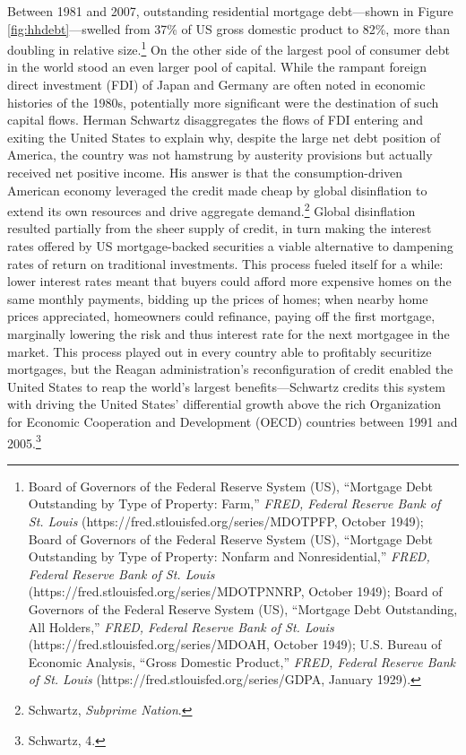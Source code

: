 \documentclass[12pt,oneside]{psthesis}
\begin{document}
Between 1981 and 2007, outstanding residential mortgage debt---shown in Figure \ref{fig:hhdebt}---swelled from 37\% of US gross domestic product to 82\%, more than doubling in relative size.\footnote{Board of Governors of the Federal Reserve System (US), ``Mortgage Debt Outstanding by Type of Property: Farm,'' \emph{FRED, Federal Reserve Bank of St. Louis} (https://fred.stlouisfed.org/series/MDOTPFP, October 1949); Board of Governors of the Federal Reserve System (US), ``Mortgage Debt Outstanding by Type of Property: Nonfarm and Nonresidential,'' \emph{FRED, Federal Reserve Bank of St. Louis} (https://fred.stlouisfed.org/series/MDOTPNNRP, October 1949); Board of Governors of the Federal Reserve System (US), ``Mortgage Debt Outstanding, All Holders,'' \emph{FRED, Federal Reserve Bank of St. Louis} (https://fred.stlouisfed.org/series/MDOAH, October 1949); U.S. Bureau of Economic Analysis, ``Gross Domestic Product,'' \emph{FRED, Federal Reserve Bank of St. Louis} (https://fred.stlouisfed.org/series/GDPA, January 1929).}
On the other side of the largest pool of consumer debt in the world stood an even larger pool of capital.
While the rampant foreign direct investment (FDI) of Japan and Germany are often noted in economic histories of the 1980s, potentially more significant were the destination of such capital flows.
Herman Schwartz disaggregates the flows of FDI entering and exiting the United States to explain why, despite the large net debt position of America, the country was not hamstrung by austerity provisions but actually received net positive income.
His answer is that the consumption-driven American economy leveraged the credit made cheap by global disinflation to extend its own resources and drive aggregate demand.\footnote{Schwartz, \emph{Subprime Nation}.}
Global disinflation resulted partially from the sheer supply of credit, in turn making the interest rates offered by US mortgage-backed securities a viable alternative to dampening rates of return on traditional investments.
This process fueled itself for a while: lower interest rates meant that buyers could afford more expensive homes on the same monthly payments, bidding up the prices of homes; when nearby home prices appreciated, homeowners could refinance, paying off the first mortgage, marginally lowering the risk and thus interest rate for the next mortgagee in the market.
This process played out in every country able to profitably securitize mortgages, but the Reagan administration's reconfiguration of credit enabled the United States to reap the world's largest benefits---Schwartz credits this system with driving the United States' differential growth above the rich Organization for Economic Cooperation and Development (OECD) countries between 1991 and 2005.\footnote{Schwartz, 4.}
\end{document}
